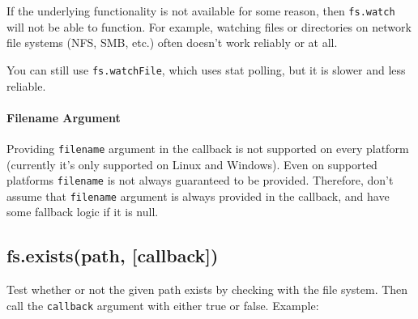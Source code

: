 If the underlying functionality is not available for some reason, then
\texttt{fs.watch} will not be able to function. For example, watching
files or directories on network file systems (NFS, SMB, etc.) often
doesn't work reliably or at all.

You can still use \texttt{fs.watchFile}, which uses stat polling, but it
is slower and less reliable.

\paragraph{Filename Argument}

Providing \texttt{filename} argument in the callback is not supported on
every platform (currently it's only supported on Linux and Windows).
Even on supported platforms \texttt{filename} is not always guaranteed
to be provided. Therefore, don't assume that \texttt{filename} argument
is always provided in the callback, and have some fallback logic if it
is null.

\begin{Shaded}
\begin{Highlighting}[]
\NormalTok{(}\NormalTok{, } 
  \NormalTok{(} 
   
    \NormalTok{(} 
  \NormalTok{\} } \NormalTok{\{}
    \NormalTok{(}\NormalTok{);}
  \NormalTok{\}}
\NormalTok{\});}
\end{Highlighting}
\end{Shaded}

\subsection{fs.exists(path, {[}callback{]})}

Test whether or not the given path exists by checking with the file
system. Then call the \texttt{callback} argument with either true or
false. Example:

\begin{Shaded}
\begin{Highlighting}[]
\NormalTok{(}\NormalTok{, } 
   \NormalTok{: }\NormalTok{);}
\NormalTok{\});}
\end{Highlighting}
\end{Shaded}

